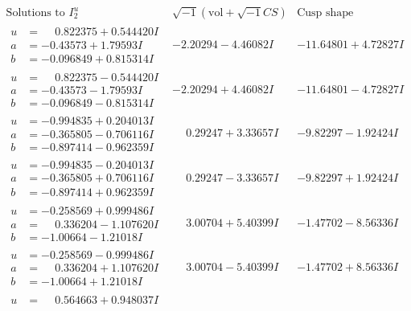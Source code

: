 \documentclass[1p]{elsarticle_modified}
\theoremstyle{definition}
\newcommand{\I}{\sqrt{-1}}
\begin{document}
$$\begin{array}{c|c|c}  
\text{Solutions to }I^u_{2}& \I (\text{vol} + \sqrt{-1}CS) & \text{Cusp shape}\\
 \hline 
\begin{aligned}
u &= \phantom{-}0.822375 + 0.544420 I \\
a &= -0.43573 + 1.79593 I \\
b &= -0.096849 + 0.815314 I\end{aligned}
 & -2.20294 - 4.46082 I & -11.64801 + 4.72827 I \\ \hline\begin{aligned}
u &= \phantom{-}0.822375 - 0.544420 I \\
a &= -0.43573 - 1.79593 I \\
b &= -0.096849 - 0.815314 I\end{aligned}
 & -2.20294 + 4.46082 I & -11.64801 - 4.72827 I \\ \hline\begin{aligned}
u &= -0.994835 + 0.204013 I \\
a &= -0.365805 - 0.706116 I \\
b &= -0.897414 - 0.962359 I\end{aligned}
 & \phantom{-}0.29247 + 3.33657 I & -9.82297 - 1.92424 I \\ \hline\begin{aligned}
u &= -0.994835 - 0.204013 I \\
a &= -0.365805 + 0.706116 I \\
b &= -0.897414 + 0.962359 I\end{aligned}
 & \phantom{-}0.29247 - 3.33657 I & -9.82297 + 1.92424 I \\ \hline\begin{aligned}
u &= -0.258569 + 0.999486 I \\
a &= \phantom{-}0.336204 - 1.107620 I \\
b &= -1.00664 - 1.21018 I\end{aligned}
 & \phantom{-}3.00704 + 5.40399 I & -1.47702 - 8.56336 I \\ \hline\begin{aligned}
u &= -0.258569 - 0.999486 I \\
a &= \phantom{-}0.336204 + 1.107620 I \\
b &= -1.00664 + 1.21018 I\end{aligned}
 & \phantom{-}3.00704 - 5.40399 I & -1.47702 + 8.56336 I \\ \hline\begin{aligned}
u &= \phantom{-}0.564663 + 0.948037 I \\

\end{aligned}
\end{array}$$
\end{document}
